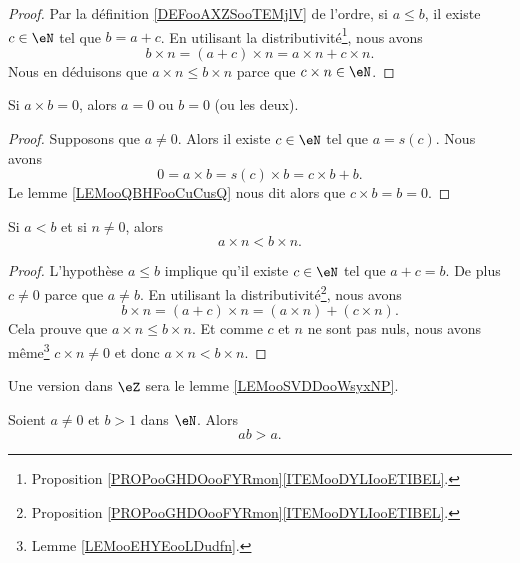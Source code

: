 \begin{proof}
    Par la définition \ref{DEFooAXZSooTEMjlV} de l'ordre, si \( a\leq b\), il existe \( c\in \eN\) tel que \( b=a+c\). En utilisant la distributivité\footnote{Proposition \ref{PROPooGHDOooFYRmon}\ref{ITEMooDYLIooETIBEL}.}, nous avons
    \begin{equation}
        b\times n=(a+c)\times n=a\times n+c\times n. 
    \end{equation}
    Nous en déduisons que \( a\times n\leq b\times n\) parce que \( c\times n \in \eN\).
\end{proof}

\begin{lemma}       \label{LEMooEHYEooLDudfn}
    Si \( a\times b=0\), alors \( a=0\) ou \( b=0\) (ou les deux).
\end{lemma}

\begin{proof}
    Supposons que \( a\neq 0\). Alors il existe \( c\in \eN\) tel que \( a=s(c)\). Nous avons
    \begin{equation}
        0=a\times b=s(c)\times b=c\times b+b.
    \end{equation}
    Le lemme \ref{LEMooQBHFooCuCusQ} nous dit alors que \( c\times b=b=0\).
\end{proof}

\begin{lemma}        \label{LEMooGUXGooBcKJdS}
    Si \( a< b\)  et si \( n\neq 0\), alors
    \begin{equation}
        a\times n<b\times n.
    \end{equation}
\end{lemma}

\begin{proof}
    L'hypothèse \( a\leq b\) implique qu'il existe \( c\in \eN\) tel que \( a+c=b\). De plus \( c\neq 0\) parce que \( a\neq b\). En utilisant la distributivité\footnote{Proposition \ref{PROPooGHDOooFYRmon}\ref{ITEMooDYLIooETIBEL}.}, nous avons
    \begin{equation}
        b\times n=(a+c)\times n=(a\times n)+(c\times n).
    \end{equation}
    Cela prouve que \( a\times n\leq b\times n\). Et comme \( c\) et \( n\) ne sont pas nuls, nous avons même\footnote{Lemme \ref{LEMooEHYEooLDudfn}.} \( c\times n\neq 0\) et donc \( a\times n<b\times n\).
\end{proof}

Une version dans \( \eZ\) sera le lemme \ref{LEMooSVDDooWsyxNP}.
\begin{lemma}
    Soient \( a\neq 0\) et \( b>1\) dans \( \eN\). Alors
    \begin{equation}
        ab>a.
    \end{equation}
\end{lemma}

